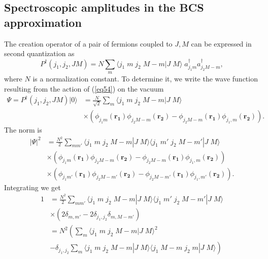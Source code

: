 \begin{subappendices}
\section{Spectroscopic amplitudes in the BCS approximation}\label{C7AppN}
The creation operator of a pair of fermions coupled to $J,M$ can be expressed in second quantization as
\begin{equation}\label{eq54}
P^\dagger(j_1,j_2,J M)=N\sum_m \langle j_1 \; m \;j_2 \;M-m|J \; M\rangle \;a^\dagger_{j_1m}a^\dagger_{j_2M-m},
\end{equation}
where $N$ is a normalization constant. To determine it, we write the wave function resulting from the action of (\ref{eq54}) on the vacuum
\begin{equation}\label{eq55}
\begin{split}
  \Psi=P^\dagger(j_1,j_2,J M) |0\rangle &= \frac{N}{\sqrt 2}\sum_m \langle j_1 \; m \;j_2 \;M-m|J \; M\rangle\\
    & \times\left(\phi_{j_1 m}(\mathbf{r_1})\phi_{j_2 M-m}(\mathbf{r_2})-\phi_{j_2 M-m}(\mathbf{r_1})\phi_{j_1,m}(\mathbf{r_2})\right).
\end{split}
\end{equation}
 The norm is
 \begin{equation}\label{eq56}
\begin{split}
  |\Psi|^2&= \frac{N^2}{2}\sum_{mm'} \langle j_1 \; m \;j_2 \;M-m|J \; M\rangle \langle j_1 \; m' \;j_2 \;M-m'|J \; M\rangle\\
    & \times \left(\phi_{j_1 m}(\mathbf{r_1})\phi_{j_2 M-m}(\mathbf{r_2})-\phi_{j_2 M-m}(\mathbf{r_1})\phi_{j_1,m}(\mathbf{r_2})\right)\\
    &\times \left(\phi_{j_1 m'}(\mathbf{r_1})\phi_{j_2 M-m'}(\mathbf{r_2})-\phi_{j_2 M-m'}(\mathbf{r_1})\phi_{j_1,m'}(\mathbf{r_2})\right).
\end{split}
\end{equation}
Integrating we get
 \begin{equation}\label{eq57}
\begin{split}
  1&= \frac{N^2}{2}\sum_{mm'} \langle j_1 \; m \;j_2 \;M-m|J \; M\rangle \langle j_1 \; m' \;j_2 \;M-m'|J \; M\rangle\\
    & \times \left(2\delta_{m,m'}-2\delta_{j_1,j_2}\delta_{m,M-m'}\right)\\
    &=N^2\left(\sum_m \langle j_1 \; m \;j_2 \;M-m|J \; M\rangle^2\right.\\
    &\left.- \delta_{j_1,j_2}\sum_m \langle j_1 \; m \;j_2 \;M-m|J \; M\rangle \langle j_1 \; M-m \;j_2 \;m|J \; M\rangle\right)\\

\end{split}
\end{equation}
\end{subappendices}
